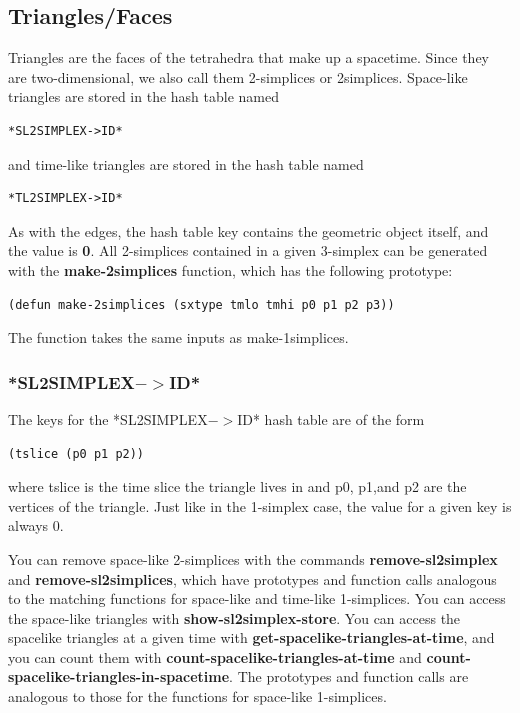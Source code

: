 \message{ !name(programmers_guide.tex)}\documentclass[12pt]{article}
\begin{document}
\subsection{Triangles/Faces}
\label{s:data:tetrahedra}
Triangles are the faces of the tetrahedra that make up a
spacetime. Since they are two-dimensional, we also call them
2-simplices or 2simplices. Space-like triangles are stored in the hash
table named
\begin{lstlisting}
*SL2SIMPLEX->ID*
\end{lstlisting}
and time-like triangles are stored in the hash table named
\begin{lstlisting}
*TL2SIMPLEX->ID*
\end{lstlisting}

As with the edges, the hash table key contains the geometric object
itself, and the value is \textbf{0}. All 2-simplices contained in a
given 3-simplex can be generated with the \textbf{make-2simplices}
function, which has the following prototype:
\begin{lstlisting}
(defun make-2simplices (sxtype tmlo tmhi p0 p1 p2 p3))
\end{lstlisting}
The function takes the same inputs as make-1simplices.

\subsubsection{*SL2SIMPLEX$->$ID*}
The keys for the *SL2SIMPLEX$->$ID* hash table are of the form
\begin{lstlisting}
(tslice (p0 p1 p2))
\end{lstlisting}
where tslice is the time slice the triangle lives in and p0, p1,and p2
are the vertices of the triangle. Just like in the 1-simplex case, the
value for a given key is always 0. 

You can remove space-like 2-simplices with the commands
\textbf{remove-sl2simplex} and \textbf{remove-sl2simplices}, which
have prototypes and function calls analogous to the matching functions
for space-like and time-like 1-simplices. You can access the
space-like triangles with \textbf{show-sl2simplex-store}. You can
access the spacelike triangles at a given time with
\textbf{get-spacelike-triangles-at-time}, and you can count them with
\textbf{count-spacelike-triangles-at-time} and
\textbf{count-spacelike-triangles-in-spacetime}. The prototypes and
function calls are analogous to those for the functions for space-like
1-simplices.
\end{document}
